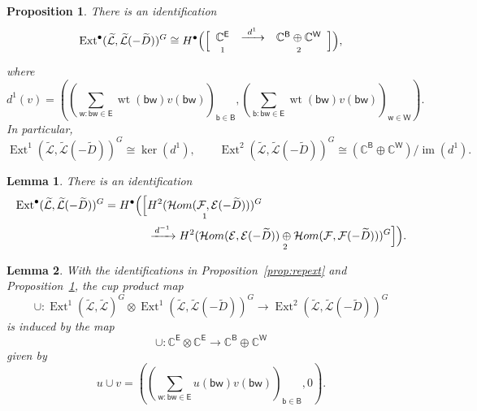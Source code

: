 \documentclass[10pt,a4paper]{amsart}
\newtheorem{proposition}{Proposition}
\newtheorem{lemma}{Lemma}
\def\B{\mathsf B}
\newcommand{\C}{{\mathbb C}}
\def\E{\mathsf E}
\def\Ext{\operatorname{Ext}}
\def\W{\mathsf W}
\def\b{\mathsf b}
\def\cale{\mathcal E}
\def\calf{\mathcal F}
\newcommand{\la}{\label}
\def\w{\mathsf w}
\newcommand{\wt}{\operatorname{wt}}
\begin{document}
\begin{proposition}\label{prop:repext2}
There is an identification
\begin{equation}\label{eq:chain_ext-d}
\Ext^\bullet(\widetilde{\mathcal L},\widetilde{\mathcal L}(-\widetilde D))^G
\cong
H^\bullet\Bigl(\Bigl[
\begin{array}{c c c}
\C^{\E} & \xrightarrow{\ d^1\ } & \C^{\B}\oplus \C^{\W}\\[-.4ex]
{\scriptstyle 1} && {\scriptstyle 2}
\end{array}
\Bigr]\Bigr),
\end{equation}
where
\[
d^1(v)
=
\left(
\left(\sum_{\w:\b\w\in\E}\wt(\b\w)v(\b\w)\right)_{\b\in\B},
\left(\sum_{\b:\b\w\in\E}\wt(\b\w)v(\b\w)\right)_{\w\in\W}
\right).
\]
In particular,
\[
\Ext^1(\widetilde{\mathcal L},\widetilde{\mathcal L}(-\widetilde D))^G
\cong
\ker(d^1), \qquad
\Ext^2(\widetilde{\mathcal L},\widetilde{\mathcal L}(-\widetilde D))^G
\cong
(\C^{\B}\oplus \C^{\W})/\operatorname{im}(d^1).
\]
\end{proposition}

\begin{lemma}\label{lem:Ext2}
There is an identification
\begin{equation}\label{eq:Ext2-concrete}
\begin{aligned}
\Ext^\bullet(\widetilde{\mathcal L},\widetilde{\mathcal L}(-\widetilde D))^G
= H^\bullet\Bigl(\Bigl[ &
\underset{1}{H^2(\mathcal H om(\calf,\cale(-\widetilde D)))^G} \\
&\xrightarrow{\,d^{-1}\,}
\underset{2}{H^2(\mathcal H om(\cale,\cale(-\widetilde D))\oplus \mathcal H om(\calf,\calf(-\widetilde D)))^G}
\Bigr]\Bigr).
\end{aligned}
\end{equation}
\end{lemma}

\begin{lemma}\la{lem::cup1}
With the identifications in Proposition~\ref{prop:repext} and Proposition~\ref{prop:repext2}, the cup product map
\[
\cup:
\Ext^1(\widetilde{\mathcal L},\widetilde{\mathcal L})^G \otimes
\Ext^1(\widetilde{\mathcal L},\widetilde{\mathcal L}(-\widetilde D))^G
\rightarrow
\Ext^2(\widetilde{\mathcal L},\widetilde{\mathcal L}(-\widetilde D))^G
\]
is induced by the map
\[
\cup: \C^\E\otimes \C^\E \rightarrow \C^\B\oplus \C^\W
\]
given by
\[
u \cup v
=
\left(
\left(\sum_{\w:\b\w\in \E} u(\b\w)v(\b\w)\right)_{\b\in \B},
0
\right).
\]
\end{lemma}
\end{document}
